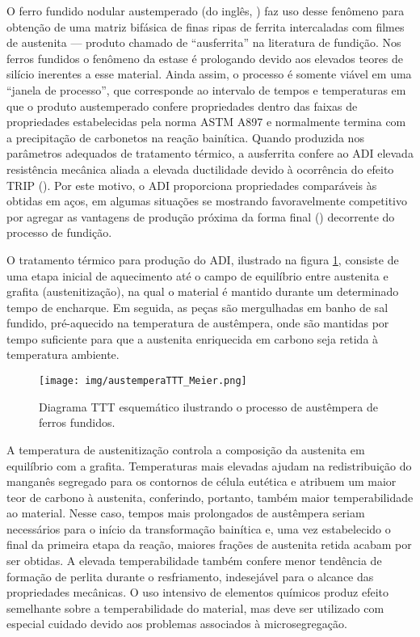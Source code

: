 O ferro fundido nodular austemperado (do inglês, ) faz uso desse fenômeno para obtenção de uma matriz bifásica de finas ripas de ferrita intercaladas com filmes de austenita --- produto chamado de ``ausferrita'' na literatura de fundição. Nos ferros fundidos o fenômeno da estase é prologando devido aos elevados teores de silício inerentes a esse material. Ainda assim, o processo é somente viável em uma ``janela de processo'', que corresponde ao intervalo de tempos e temperaturas em que o produto austemperado confere propriedades dentro das faixas de propriedades estabelecidas pela norma ASTM A897\cite{Bayati1999,ASTMA8972006} e normalmente termina com a precipitação de carbonetos na reação bainítica. Quando produzida nos parâmetros adequados de tratamento térmico, a ausferrita confere ao ADI elevada resistência mecânica aliada a elevada ductilidade devido à ocorrência do efeito TRIP ()\cite{Goldenstein2002}. Por este motivo, o ADI proporciona propriedades comparáveis às obtidas em aços, em algumas situações se mostrando favoravelmente competitivo por agregar as vantagens de produção próxima da forma final () decorrente do processo de fundição\cite{Trudel1997,Hayrynen2002}.

O tratamento térmico para produção do ADI, ilustrado na figura \ref{fig:austempera}, consiste de uma etapa inicial de aquecimento até o campo de equilíbrio entre austenita e grafita (austenitização), na qual o material é mantido durante um determinado tempo de encharque. Em seguida, as peças são mergulhadas em banho de sal fundido, pré-aquecido na temperatura de austêmpera, onde são mantidas por tempo suficiente para que a austenita enriquecida em carbono seja retida à temperatura ambiente\cite{Trudel1997}.

\begin{figure}
	\texttt{[image: img/austemperaTTT\_Meier.png]}
	\caption{Diagrama TTT esquemático ilustrando o processo de austêmpera de ferros fundidos\cite{Meier2013a}.}
	\label{fig:austempera}
\end{figure}

A temperatura de austenitização controla a composição da austenita em equilíbrio com a grafita. Temperaturas mais elevadas ajudam na redistribuição do manganês segregado para os contornos de célula eutética e atribuem um maior teor de carbono à austenita, conferindo, portanto, também maior temperabilidade ao material. Nesse caso, tempos mais prolongados de austêmpera seriam necessários para o início da transformação bainítica e, uma vez estabelecido o final da primeira etapa da reação, maiores frações de austenita retida acabam por ser obtidas. A elevada temperabilidade também confere menor tendência de formação de perlita durante o resfriamento, indesejável para o alcance das propriedades mecânicas\cite{Trudel1997}. O uso intensivo de elementos químicos produz efeito semelhante sobre a temperabilidade do material, mas deve ser utilizado com especial cuidado devido aos problemas associados à microsegregação\cite{Bayati1995,Velez1996}.

